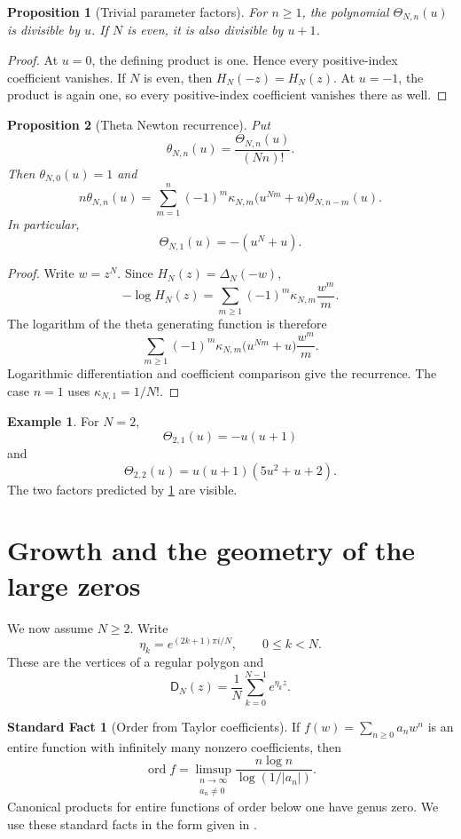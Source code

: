 \documentclass[11pt]{article}
\newtheorem{proposition}[proposition]{Proposition}
\theoremstyle{definition}
\newtheorem{example}[example]{Example}
\newtheorem{standardfact}[standardfact]{Standard Fact}
\theoremstyle{remark}
\newcommand{\Dfun}{\mathsf D}
\newcommand{\Thetafun}{\mathsf\Theta}
\newcommand{\ord}{\operatorname{ord}}
\begin{document}
\begin{proposition}[Trivial parameter factors]\label{prop:theta_factors}
For $n\geq1$, the polynomial $\Thetafun_{N,n}(u)$ is divisible by $u$.  If $N$ is even, it is also divisible by $u+1$.
\end{proposition}

\begin{proof}
At $u=0$, the defining product is one.  Hence every positive-index coefficient vanishes.  If $N$ is even, then $H_N(-z)=H_N(z)$.  At $u=-1$, the product is again one, so every positive-index coefficient vanishes there as well.
\end{proof}


\begin{proposition}[Theta Newton recurrence]\label{prop:theta_newton_recurrence}
Put
\[
\theta_{N,n}(u)=\frac{\Thetafun_{N,n}(u)}{(Nn)!}.
\]
Then $\theta_{N,0}(u)=1$ and
\[
n\theta_{N,n}(u)
=
\sum_{m=1}^{n}
(-1)^m\kappa_{N,m}
\bigl(u^{Nm}+u\bigr)
\theta_{N,n-m}(u).
\]
In particular,
\[
\Thetafun_{N,1}(u)=-(u^N+u).
\]
\end{proposition}

\begin{proof}
Write $w=z^N$.  Since $H_N(z)=\Delta_N(-w)$,
\[
-\log H_N(z)
=
\sum_{m\geq1}(-1)^m\kappa_{N,m}\frac{w^m}{m}.
\]
The logarithm of the theta generating function is therefore
\[
\sum_{m\geq1}
(-1)^m\kappa_{N,m}
\bigl(u^{Nm}+u\bigr)
\frac{w^m}{m}.
\]
Logarithmic differentiation and coefficient comparison give the recurrence.  The case $n=1$ uses $\kappa_{N,1}=1/N!$.
\end{proof}

\begin{example}\label{ex:theta_even}
For $N=2$,
\[
\Thetafun_{2,1}(u)=-u(u+1)
\]
and
\[
\Thetafun_{2,2}(u)
=
u(u+1)(5u^2+u+2).
\]
The two factors predicted by \cref{prop:theta_factors} are visible.
\end{example}

\section{Growth and the geometry of the large zeros}\label{sec:zero_geometry}

We now assume $N\geq2$.  Write
\[
\eta_k=e^{(2k+1)\pi i/N},
\qquad 0\leq k<N.
\]
These are the vertices of a regular polygon and
\[
\Dfun_N(z)=\frac1N\sum_{k=0}^{N-1}e^{\eta_kz}.
\]

\begin{standardfact}[Order from Taylor coefficients]\label{sf:coefficient_order}
If $f(w)=\sum_{n\geq0}a_nw^n$ is an entire function with infinitely many nonzero coefficients, then
\[
\ord f
=
\limsup_{\substack{n\to\infty\\a_n\ne0}}
\frac{n\log n}{\log(1/|a_n|)}.
\]
Canonical products for entire functions of order below one have genus zero.  We use these standard facts in the form given in \cite{Boas1954,Titchmarsh1939}.
\end{standardfact}
\end{document}
